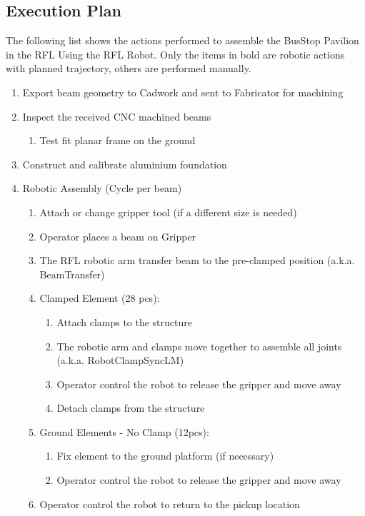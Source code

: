 \begin{itemize}
\begin{enumerate}
\subsection{Execution Plan}

The following list shows the actions performed to assemble the BusStop Pavilion in the RFL Using the RFL Robot. Only the items in bold are robotic actions with planned trajectory, others are performed manually. 
\begin{enumerate}
\item Export beam geometry to Cadwork and sent to Fabricator for machining
\item Inspect the received CNC machined beams
    \begin{enumerate}
    \item Test fit planar frame on the ground
    \end{enumerate}
\item Construct and calibrate aluminium foundation 
\item Robotic Assembly (Cycle per beam)
    \begin{enumerate}
        \item Attach or change gripper tool (if a different size is needed)
        \item Operator places a beam on Gripper
        \item The RFL robotic arm transfer beam to the pre-clamped position (a.k.a. BeamTransfer)
        \item Clamped Element (28 pcs):
\begin{enumerate}
        \item Attach clamps to the structure 
        \item The robotic arm and clamps move together to assemble all joints (a.k.a. RobotClampSyncLM)
        \item Operator control the robot to release the gripper and move away
        \item Detach clamps from the structure
\end{enumerate}
     \item Ground Elements - No Clamp (12pcs):
        \begin{enumerate}
        \item Fix element to the ground platform (if necessary)
        \item Operator control the robot to release the gripper and move away
        \end{enumerate}
    \item Operator control the robot to return to the pickup location 
\end{enumerate}


\end{enumerate}
\end{enumerate}
\end{itemize}
